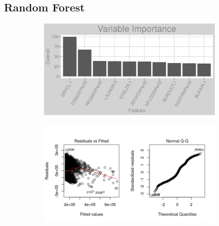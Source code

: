 \subsection{Random Forest}
\label{appendix:natural_gas:rf}
\begin{figure}[h]
\centering
\begin{subfigure}{1\textwidth}
\centering
\includegraphics[width=.99\textwidth, height=0.3\textheight]{Images/natural_gas_psf_rf_vars.png}
\end{subfigure}
\begin{subfigure}{1\textwidth}
\centering
\includegraphics[width=.99\textwidth, height=0.475\textheight]{Images/natural_gas_psf_rf_res_1.png}
\end{subfigure}
\end{figure}
\FloatBarrier
\newpage
